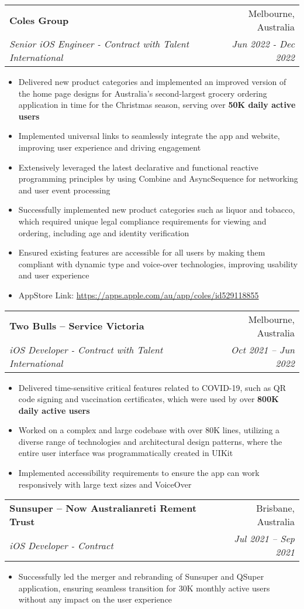 \documentclass[letterpaper,11pt]{article}
\makeatletter
\newcommand{\resumeItem}[1]{
  \item{
    { #1 \vspace{-2pt}}
  }
}
\newcommand{\resumeSubheading}[4]{
  \vspace{2pt}\item
    \begin{tabular*}{0.97\textwidth}{l@{\extracolsep{\fill}}r}
      \textbf{#1} & #2 \\
      \textit{\small#3} & \textit{\small #4} \\
    \end{tabular*}\vspace{-5pt}
}
\newcommand{\resumeItemListStart}{\begin{itemize}}
\newcommand{\resumeItemListEnd}{\end{itemize}\vspace{-5pt}}
\makeatother
\begin{document}
    \resumeSubheading
      {Coles Group}{Melbourne, Australia}
      {Senior iOS Engineer - Contract with Talent International}{Jun 2022 - Dec 2022}
      \resumeItemListStart
        \resumeItem {Delivered new product categories and implemented an improved version of the home page designs for Australia's second-largest grocery ordering application in time for the Christmas season, serving over \textbf{50K daily active users}}
        \resumeItem {Implemented universal links to seamlessly integrate the app and website, improving user experience and driving engagement}
        \resumeItem{Extensively leveraged the latest declarative and functional reactive programming principles by using Combine and AsyncSequence for networking and user event processing}
        \resumeItem {Successfully implemented new product categories such as liquor and tobacco, which required unique legal compliance requirements for viewing and ordering, including age and identity verification}
        \resumeItem {Ensured existing features are accessible for all users by making them compliant with dynamic type and voice-over technologies, improving usability and user experience}
        \resumeItem{AppStore Link: \url{https://apps.apple.com/au/app/coles/id529118855}}
      \resumeItemListEnd

    \resumeSubheading
      {Two Bulls -- Service Victoria}{Melbourne, Australia}
      {iOS Developer - Contract with Talent International}{Oct 2021 -- Jun 2022}
      \resumeItemListStart
        \resumeItem{Delivered time-sensitive critical features related to COVID-19, such as QR code signing and vaccination certificates, which were used by over \textbf{800K daily active users}}
        \resumeItem{Worked on a complex and large codebase with over 80K lines, utilizing a diverse range of technologies and architectural design patterns, where the entire user interface was programmatically created in UIKit}
        \resumeItem{Implemented accessibility requirements to ensure the app can work responsively with large text sizes and VoiceOver}
      \resumeItemListEnd

    \resumeSubheading
      {Sunsuper -- Now Australianreti Rement Trust}{Brisbane, Australia}
      {iOS Developer - Contract}{Jul 2021 -- Sep 2021}
        \resumeItemListStart
            \resumeItem{Successfully led the merger and rebranding of Sunsuper and QSuper application, ensuring seamless transition for 30K monthly active users without any impact on the user experience}
        \resumeItemListEnd
\end{document}
